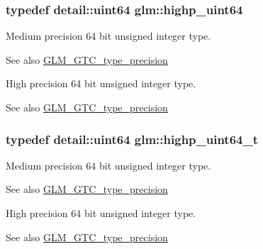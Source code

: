\subsubsection[{\texorpdfstring{highp\+\_\+uint64}{highp_uint64}}]{\setlength{\rightskip}{0pt plus 5cm}typedef detail\+::uint64 {\bf glm\+::highp\+\_\+uint64}}\hypertarget{group__gtc__type__precision_ga8079c653e20cda03d34b99de629a7b09}{}\label{group__gtc__type__precision_ga8079c653e20cda03d34b99de629a7b09}
Medium precision 64 bit unsigned integer type. \begin{DoxySeeAlso}{See also}
\hyperlink{group__gtc__type__precision}{G\+L\+M\+\_\+\+G\+T\+C\+\_\+type\+\_\+precision}
\end{DoxySeeAlso}
High precision 64 bit unsigned integer type. \begin{DoxySeeAlso}{See also}
\hyperlink{group__gtc__type__precision}{G\+L\+M\+\_\+\+G\+T\+C\+\_\+type\+\_\+precision} 
\end{DoxySeeAlso}
\subsubsection[{\texorpdfstring{highp\+\_\+uint64\+\_\+t}{highp_uint64_t}}]{\setlength{\rightskip}{0pt plus 5cm}typedef detail\+::uint64 {\bf glm\+::highp\+\_\+uint64\+\_\+t}}\hypertarget{group__gtc__type__precision_ga6e66f40c5909bfc872b068187fa6029e}{}\label{group__gtc__type__precision_ga6e66f40c5909bfc872b068187fa6029e}
Medium precision 64 bit unsigned integer type. \begin{DoxySeeAlso}{See also}
\hyperlink{group__gtc__type__precision}{G\+L\+M\+\_\+\+G\+T\+C\+\_\+type\+\_\+precision}
\end{DoxySeeAlso}
High precision 64 bit unsigned integer type. \begin{DoxySeeAlso}{See also}
\hyperlink{group__gtc__type__precision}{G\+L\+M\+\_\+\+G\+T\+C\+\_\+type\+\_\+precision} 
\end{DoxySeeAlso}

